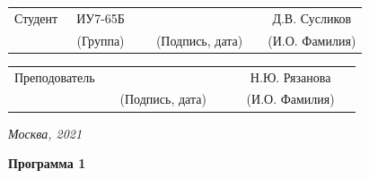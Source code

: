 \documentclass[14pt, a4paper]{extarticle}
\begin{document}
\noindent
{}
\\


\noindent
{}
\\

\vspace{1.5cm}
\noindent
\begin{tabular}{l c c c c c}
	Студент      & ~ИУ7-65Б~               & \hspace{2.5cm} & \hspace{2cm}                 & &  Д.В. Сусликов \\\cline{2-2}\cline{4-4} \cline{6-6} 
	\hspace{3cm} & {\footnotesize(Группа)} &                & {\footnotesize(Подпись, дата)} & & {\footnotesize(И.О. Фамилия)}
\end{tabular}

\noindent
\begin{tabular}{l c c c c}
	Преподователь & \hspace{5cm}   & \hspace{2cm}                 & & ~~~Н.Ю. Рязанова~~~\\\cline{3-3} \cline{5-5} 
	\hspace{3cm}  &                & {\footnotesize(Подпись, дата)} & & {\footnotesize(И.О. Фамилия)}
\end{tabular}

\vspace{0.6cm}
\begin{center}	
	\vfill
	\large \textit {Москва, 2021}
\end{center}

\thispagestyle {empty}
\pagebreak

\clearpage
\textbf{Программа 1} \par




\end{document}
